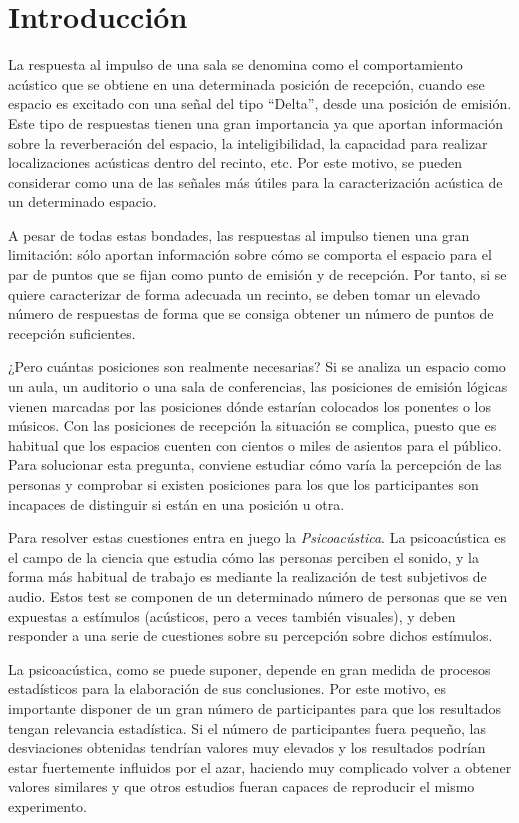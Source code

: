 \documentclass[11pt,a4paper,twoside]{book}
\author{Víctor de Tejada Molera}
\begin{document}
\chapter{Introducción}
    La respuesta al impulso de una sala se denomina como el comportamiento acústico que se obtiene en una determinada posición de recepción, cuando ese espacio es excitado con una señal del tipo ``Delta'', desde una posición de emisión. Este tipo de respuestas tienen una gran importancia ya que aportan información sobre la reverberación del espacio, la inteligibilidad, la capacidad para realizar localizaciones acústicas dentro del recinto, etc. Por este motivo, se pueden considerar como una de las señales más útiles para la caracterización acústica de un determinado espacio. 
    
    A pesar de todas estas bondades, las respuestas al impulso tienen una gran limitación: sólo aportan información sobre cómo se comporta el espacio para el par de puntos que se fijan como punto de emisión y de recepción. Por tanto, si se quiere caracterizar de forma adecuada un recinto, se deben tomar un elevado número de respuestas de forma que se consiga obtener un número de puntos de recepción suficientes.
    
    ¿Pero cuántas posiciones son realmente necesarias? Si se analiza un espacio como un aula, un auditorio o una sala de conferencias, las posiciones de emisión lógicas vienen marcadas por las posiciones dónde estarían colocados los ponentes o los músicos. Con las posiciones de recepción la situación se complica, puesto que es habitual que los espacios cuenten con cientos o miles de asientos para el público. Para solucionar esta pregunta, conviene estudiar cómo varía la percepción de las personas y comprobar si existen posiciones para los que los participantes son incapaces de distinguir si están en una posición u otra.
    
    Para resolver estas cuestiones entra en juego la \textit{Psicoacústica}. La psicoacústica es el campo de la ciencia que estudia cómo las personas perciben el sonido, y la forma más habitual de trabajo es mediante la realización de test subjetivos de audio. Estos test se componen de un determinado número de personas que se ven expuestas a estímulos (acústicos, pero a veces también visuales), y deben responder a una serie de cuestiones sobre su percepción sobre dichos estímulos.
    
    La psicoacústica, como se puede suponer, depende en gran medida de procesos estadísticos para la elaboración de sus conclusiones. Por este motivo, es importante disponer de un gran número de participantes para que los resultados tengan relevancia estadística. Si el número de participantes fuera pequeño, las desviaciones obtenidas tendrían valores muy elevados y los resultados podrían estar fuertemente influidos por el azar, haciendo muy complicado volver a obtener valores similares y que otros estudios fueran capaces de reproducir el mismo experimento.
    
\end{document}
